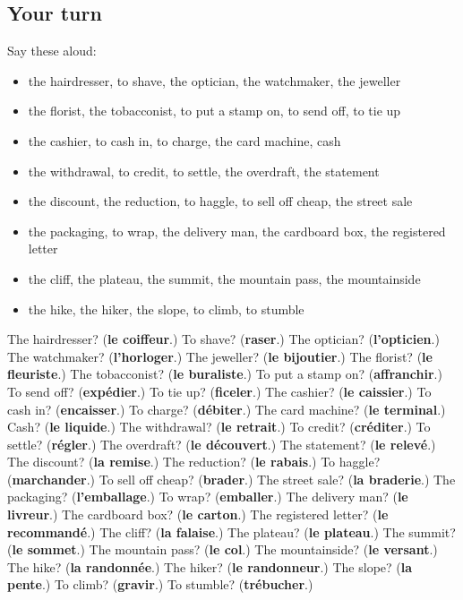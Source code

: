 \subsection*{Your turn}
Say these aloud:

\begin{itemize}
\raggedright
  \item the hairdresser, to shave, the optician, the watchmaker, the jeweller
  \item the florist, the tobacconist, to put a stamp on, to send off, to tie up
  \item the cashier, to cash in, to charge, the card machine, cash
  \item the withdrawal, to credit, to settle, the overdraft, the statement
  \item the discount, the reduction, to haggle, to sell off cheap, the street sale
  \item the packaging, to wrap, the delivery man, the cardboard box, the registered letter
  \item the cliff, the plateau, the summit, the mountain pass, the mountainside
  \item the hike, the hiker, the slope, to climb, to stumble
\end{itemize}

\begin{tcolorbox}[breakable,colback=teal!4,colframe=teal!35!black,title={Before you move on}]
The hairdresser? (\textbf{le coiffeur}.) To shave? (\textbf{raser}.) The optician? (\textbf{l'opticien}.) The watchmaker? (\textbf{l'horloger}.) The jeweller? (\textbf{le bijoutier}.) The florist? (\textbf{le fleuriste}.) The tobacconist? (\textbf{le buraliste}.) To put a stamp on? (\textbf{affranchir}.) To send off? (\textbf{expédier}.) To tie up? (\textbf{ficeler}.) The cashier? (\textbf{le caissier}.) To cash in? (\textbf{encaisser}.) To charge? (\textbf{débiter}.) The card machine? (\textbf{le terminal}.) Cash? (\textbf{le liquide}.) The withdrawal? (\textbf{le retrait}.) To credit? (\textbf{créditer}.) To settle? (\textbf{régler}.) The overdraft? (\textbf{le découvert}.) The statement? (\textbf{le relevé}.) The discount? (\textbf{la remise}.) The reduction? (\textbf{le rabais}.) To haggle? (\textbf{marchander}.) To sell off cheap? (\textbf{brader}.) The street sale? (\textbf{la braderie}.) The packaging? (\textbf{l'emballage}.) To wrap? (\textbf{emballer}.) The delivery man? (\textbf{le livreur}.) The cardboard box? (\textbf{le carton}.) The registered letter? (\textbf{le recommandé}.) The cliff? (\textbf{la falaise}.) The plateau? (\textbf{le plateau}.) The summit? (\textbf{le sommet}.) The mountain pass? (\textbf{le col}.) The mountainside? (\textbf{le versant}.) The hike? (\textbf{la randonnée}.) The hiker? (\textbf{le randonneur}.) The slope? (\textbf{la pente}.) To climb? (\textbf{gravir}.) To stumble? (\textbf{trébucher}.)
\end{tcolorbox}

